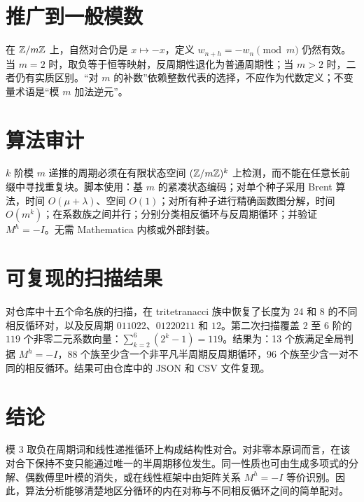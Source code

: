\documentclass[11pt,a4paper]{article}
\begin{document}
\section{推广到一般模数}
在 \(\mathbb Z/m\mathbb Z\) 上，自然对合仍是 \(x\mapsto-x\)，定义 \(w_{n+h}=-w_n\pmod m\) 仍然有效。当 \(m=2\) 时，取负等于恒等映射，反周期性退化为普通周期性；当 \(m>2\) 时，二者仍有实质区别。“对 \(m\) 的补数”依赖整数代表的选择，不应作为代数定义；不变量术语是“模 \(m\) 加法逆元”。
\section{算法审计}
\(k\) 阶模 \(m\) 递推的周期必须在有限状态空间 \((\mathbb Z/m\mathbb Z)^k\) 上检测，而不能在任意长前缀中寻找重复块。脚本使用：基 \(m\) 的紧凑状态编码；对单个种子采用 Brent 算法，时间 \(O(\mu+\lambda)\)、空间 \(O(1)\)；对所有种子进行精确函数图分解，时间 \(O(m^k)\)；在系数族之间并行；分别分类相反循环与反周期循环；并验证 \(M^h=-I\)。无需 Mathematica 内核或外部封装。
\section{可复现的扫描结果}
对仓库中十五个命名族的扫描，在 tritetranacci 族中恢复了长度为 24 和 8 的不同相反循环对，以及反周期 \(011022\)、\(01220211\) 和 \(12\)。第二次扫描覆盖 2 至 6 阶的 \(119\) 个非零二元系数向量：\(\sum_{k=2}^{6}(2^k-1)=119\)。结果为：13 个族满足全局判据 \(M^h=-I\)，88 个族至少含一个非平凡半周期反周期循环，96 个族至少含一对不同的相反循环。结果可由仓库中的 JSON 和 CSV 文件复现。
\section*{结论}
模 3 取负在周期词和线性递推循环上构成结构性对合。对非零本原词而言，在该对合下保持不变只能通过唯一的半周期移位发生。同一性质也可由生成多项式的分解、偶数傅里叶模的消失，或在线性框架中由矩阵关系 \(M^h=-I\) 等价识别。因此，算法分析能够清楚地区分循环的内在对称与不同相反循环之间的简单配对。
\end{document}
